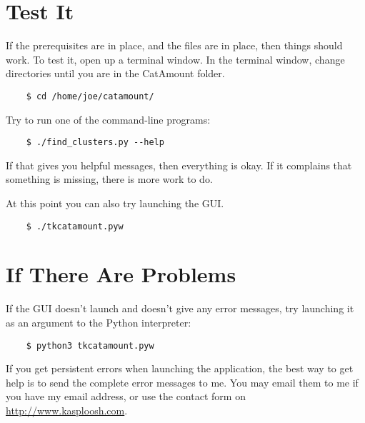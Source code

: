 \section{Test It}

If the prerequisites are in place, and the files are in place, then things
should work. To test it, open up a terminal window.
In the terminal window, change directories until you are in the CatAmount
folder.

\begin{verbatim}
    $ cd /home/joe/catamount/
\end{verbatim}

Try to run one of the command-line programs:

\begin{verbatim}
    $ ./find_clusters.py --help
\end{verbatim}

If that gives you helpful messages, then everything is okay. If it complains
that something is missing, there is more work to do.

At this point you can also try launching the GUI.

\begin{verbatim}
    $ ./tkcatamount.pyw
\end{verbatim}

\section{If There Are Problems}

If the GUI doesn't launch and doesn't give any error messages, try launching
it as an argument to the Python interpreter:

\begin{verbatim}
    $ python3 tkcatamount.pyw
\end{verbatim}

If you get persistent errors when launching the application, the best way to
get help is to send the complete error messages to me. You may email them to
me if you have my email address, or use the contact form on
\url{http://www.kasploosh.com}.
